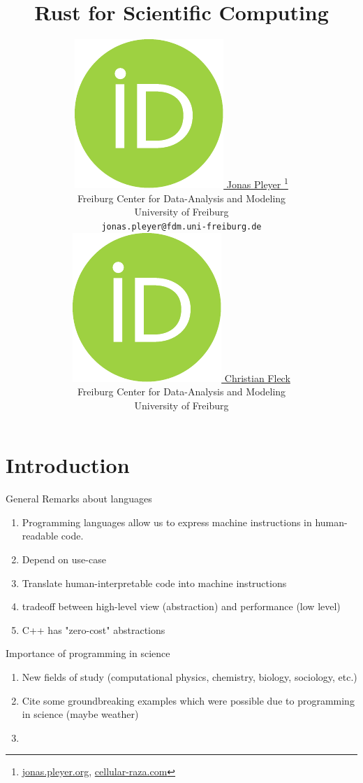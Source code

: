 \documentclass{article}
\title{Rust for Scientific Computing}
\author{
    \href{https://orcid.org/0009-0001-0613-7978}{
        \includegraphics[scale=0.06]{orcid.pdf}
        \hspace{1mm}Jonas Pleyer
    }
    \thanks{
        \href{https://jonas.pleyer.org}{jonas.pleyer.org},
        \href{https://cellular-raza.com}{cellular-raza.com}
    }\\
    Freiburg Center for Data-Analysis and Modeling\\
    University of Freiburg\\
    \texttt{jonas.pleyer@fdm.uni-freiburg.de} \\
    \And
    \href{https://orcid.org/0000-0002-6371-4495}{
        \includegraphics[scale=0.06]{orcid.pdf}
        \hspace{1mm}Christian Fleck
    }\\
    Freiburg Center for Data-Analysis and Modeling\\
    University of Freiburg
}
\begin{document}
\maketitle

\begin{abstract}
\end{abstract}

\pagebreak
\tableofcontents

\twocolumn
\pagebreak


\section{Introduction}
\label{section:introduction}

General Remarks about languages
\begin{enumerate}
    \item Programming languages allow us to express machine instructions in human-readable code.
    \item Depend on use-case
    \item Translate human-interpretable code into machine instructions
    \item tradeoff between high-level view (abstraction) and performance (low level)
    \item C++ has "zero-cost" abstractions
\end{enumerate}

Importance of programming in science
\begin{enumerate}
    \item New fields of study (computational physics, chemistry, biology, sociology, etc.)
    \item Cite some groundbreaking examples which were possible due to programming in
        science (maybe weather)
    \item
\end{enumerate}
\end{document}
